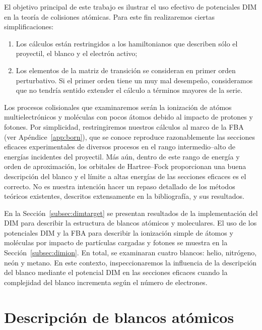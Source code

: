 El objetivo  principal de este trabajo es ilustrar el uso efectivo de 
potenciales DIM en la teoría de colisiones atómicas. Para este fin 
realizaremos ciertas simplificaciones: 
\begin{enumerate}
\item Los cálculos están restringidos a los hamiltonianos que describen
sólo el proyectil, el blanco y el electrón activo;
\item Los elementos de la matriz de transición se consideran en primer 
orden perturbativo. Si el primer orden tiene un muy mal desempeño, 
consideramos que no tendría sentido extender el cálculo a términos 
mayores de la serie. 
\end{enumerate}
Los procesos colisionales que examinaremos serán la ionización de atómos 
multielectrónicos y moléculas con pocos átomos debido al impacto de 
protones y fotones. Por simplicidad, restringiremos nuestros cálculos 
al marco de la FBA (ver Apéndice~\ref{app:born}), que se conoce  
reproduce razonablemente las secciones eficaces experimentales de 
diversos procesos en el rango intermedio--alto de energías incidentes 
del proyectil. Más aún, dentro de este rango de energía y orden de 
aproximación, los orbitales de Hartree--Fock proporcionan una buena 
descripción del blanco y el límite a altas energías de las secciones 
eficaces es el correcto. No es nuestra intención hacer un repaso 
detallado de los métodos teóricos existentes, descritos extensamente en 
la bibliografía, y sus resultados. 

En la Sección~\ref{subsec:dimtarget} se presentan resultados de la  
implementación del DIM para describir la estructura de blancos atómicos 
y moleculares. El uso de los potenciales DIM y la FBA para describir la 
ionización simple de átomos y moléculas por impacto de partículas 
cargadas y fotones se muestra en la Sección~\ref{subsec:dimion}.
En total, se examinaran cuatro blancos: helio, nitrógeno, neón y metano. 
En este contexto, inspeccionaremos la influencia de la descripción del 
blanco mediante el potencial DIM en las secciones eficaces cuando la 
complejidad del blanco incrementa según el número de electrones.

\begin{comment}
\end{comment}

\section{Descripción de blancos atómicos}
\label{sec:atomos}

